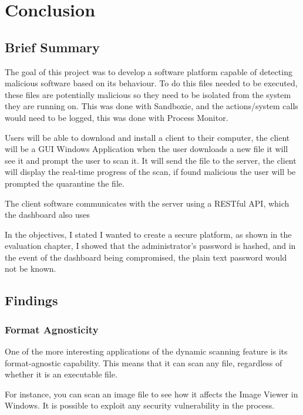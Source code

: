 \chapter{Conclusion}

\section{Brief Summary}
The goal of this project was to develop a software platform capable of
detecting malicious software based on its behaviour.
To do this files needed to be executed, these files are potentially malicious
so they need to be isolated from the system they are running on.
This was done with Sandboxie, and the actions/system calls would need to be logged,
this was done with Process Monitor.

Users will be able to download and install a client to their computer,
the client will be a GUI Windows Application
when the user downloads a new file it will see it and prompt the user to scan it.
It will send the file to the server, the client will display the real-time progress of the scan,
if found malicious the user will be prompted the quarantine the file.

The client software communicates with the server using a
RESTful API, which the dashboard also uses

In the objectives, I stated I wanted to create a secure platform, as shown in the evaluation chapter, I showed that the administrator's password is hashed, and in the event of the dashboard being compromised, the plain text password would not be known.

\section{Findings}
\subsection{Format Agnosticity}
One of the more interesting applications of the dynamic scanning
feature is its format-agnostic capability.
This means that it can scan any file, regardless of whether it is an executable file.

For instance, you can scan an image file to
see how it affects the Image Viewer in Windows.
It is possible to exploit any security vulnerability in the process.

